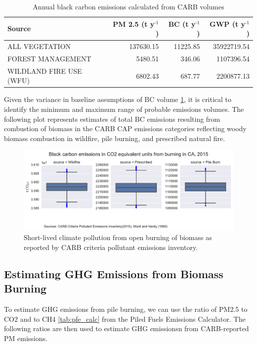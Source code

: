 \documentclass[a4paper]{article}
\begin{document}
\begin{table}[htb]
\caption{Annual black carbon emissions calculated from CARB volumes \label{tab:carb_bc}}
\centering
\begin{tabular}{lrrr}
Source & PM 2.5 (t y$^{\text{-1}}$) & BC (t y$^{\text{-1}}$) & GWP (t y$^{\text{-1}}$)\\
\hline
ALL VEGETATION & 137630.15 & 11225.85 & 35922719.54\\
FOREST MANAGEMENT & 5480.51 & 346.06 & 1107396.54\\
WILDLAND FIRE USE (WFU) & 6802.43 & 687.77 & 2200877.13\\
\end{tabular}
\end{table}



Given the variance in baseline assumptions of BC volume \ref{tab:bc_pm}, it is critical to identify the minimum and maximum range of probable emissions volumes.
The following plot represents estimates of total BC emissions resulting
from combustion of biomass in the CARB CAP emissions categories
reflecting woody biomass combustion in wildfire, pile burning, and
prescribed natural fire.


\begin{figure}[htb]
\centering
\includegraphics[width=\textwidth]{./graphics/bc_prob_gwp.pdf}
\caption{Short-lived climate pollution from open burning of biomass as reported by CARB criteria pollutant emissions inventory.\label{tab:bc_pm}}
\end{figure}

\subsection{Estimating GHG Emissions from Biomass Burning}
\label{sec-2-2}
To estimate GHG emissions from pile burning, we can use the ratio of
PM2.5 to CO2 and to CH4 \ref{tab:pfe_calc} from the Piled Fuels Emissions Calculator. The following ratios are then used to estimate GHG emissionsn from CARB-reported PM emissions.
\end{document}
